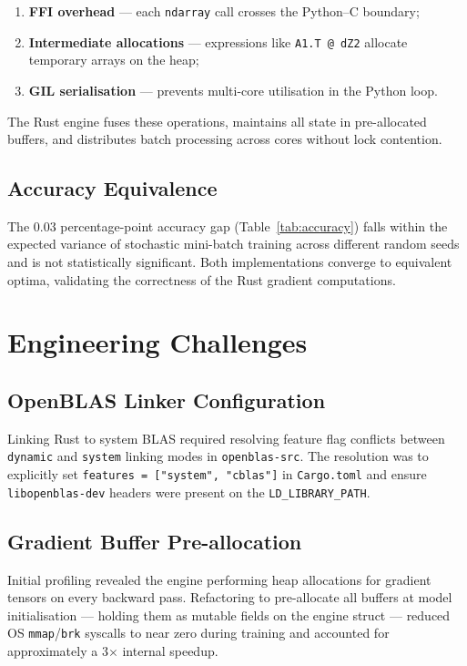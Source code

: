 \documentclass[11pt]{article}
\begin{document}
\begin{enumerate}[leftmargin=*, itemsep=1pt]
  \item \textbf{FFI overhead} --- each \texttt{ndarray} call crosses the Python--C boundary;
  \item \textbf{Intermediate allocations} --- expressions like \texttt{A1.T @ dZ2} allocate temporary arrays on the heap;
  \item \textbf{GIL serialisation} --- prevents multi-core utilisation in the Python loop.
\end{enumerate}

The Rust engine fuses these operations, maintains all state in pre-allocated buffers, and distributes batch processing across cores without lock contention.

\subsection{Accuracy Equivalence}

The 0.03 percentage-point accuracy gap (Table~\ref{tab:accuracy}) falls within the expected variance of stochastic mini-batch training across different random seeds and is not statistically significant. Both implementations converge to equivalent optima, validating the correctness of the Rust gradient computations.

\section{Engineering Challenges}

\subsection{OpenBLAS Linker Configuration}

Linking Rust to system BLAS required resolving feature flag conflicts between \texttt{dynamic} and \texttt{system} linking modes in \texttt{openblas-src}. The resolution was to explicitly set \texttt{features = ["system", "cblas"]} in \texttt{Cargo.toml} and ensure \texttt{libopenblas-dev} headers were present on the \texttt{LD\_LIBRARY\_PATH}.

\subsection{Gradient Buffer Pre-allocation}

Initial profiling revealed the engine performing heap allocations for gradient tensors on every backward pass. Refactoring to pre-allocate all buffers at model initialisation --- holding them as mutable fields on the engine struct --- reduced OS \texttt{mmap}/\texttt{brk} syscalls to near zero during training and accounted for approximately a 3$\times$ internal speedup.
\end{document}
